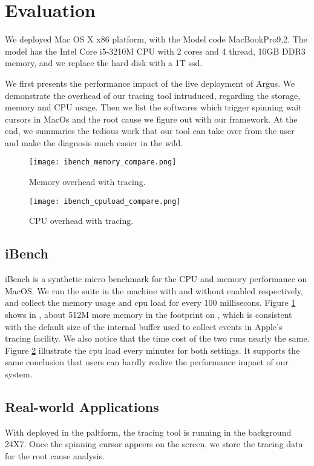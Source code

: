 \section{Evaluation}
We deployed \xxx Mac OS X x86 platform, with the Model code MacBookPro9,2.
The model has the Intel Core i5-3210M CPU with 2 cores and 4 thread,
10GB DDR3 memory, and we replace the hard disk with a 1T ssd.

We first presents the performance impact of the live deployment of Argus.
We demonstrate the overhead of our tracing tool intruduced, regarding the storage, memory and CPU usage.
Then we list the softwares which trigger spinning wait cursors in MacOs and the root cause we figure out with our framework.
At the end, we summaries the tedious work that our tool can take over from the user and make the diagnosis much easier in the wild.

\begin{figure}[tb]
    \centering
    \texttt{[image: ibench\_memory\_compare.png]}
    \caption{Memory overhead with tracing.}
    \label{fig:ibench_memory_overhead}
\end{figure}

\begin{figure}[tb]
    \centering
    \texttt{[image: ibench\_cpuload\_compare.png]}
    \caption{CPU overhead with tracing.}
    \label{fig:ibench_cpu_overhead}
\end{figure}

\subsection{iBench}
iBench is a synthetic micro benchmark for the CPU and memory performance on MacOS.
We run the suite in the machine with and without \xxx enabled respectively,
and collect the memory usage and cpu load for every 100 millisecons.
Figure \ref{fig:ibench_memory_overhead} shows in \xxx, about 512M more memory in the footprint on \xxx,
which is consistent with the default size of the internal buffer used to collect events in Apple's tracing facility.
We also notice that the time cost of the two runs nearly the same.
Figure \ref{fig:ibench_cpu_overhead} illustrate the cpu load every minutes for both settings.
It supports the same conclusion that
users can hardly realize the performance impact of our system.

\subsection{Real-world Applications}
With \xxx deployed in the paltform, the tracing tool is running in the background 24X7.
Once the spinning cursor appeers on the screen,
we store the tracing data for the root cause analysis.
 
